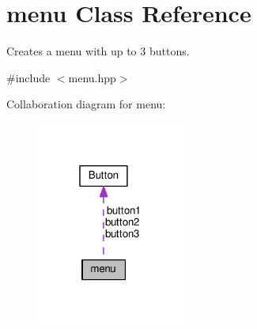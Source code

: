 \hypertarget{classmenu}{}\section{menu Class Reference}
\label{classmenu}


Creates a menu with up to 3 buttons.  




{\ttfamily \#include $<$menu.\+hpp$>$}



Collaboration diagram for menu\+:\nopagebreak
\begin{figure}[H]
\begin{center}
\leavevmode
\includegraphics[width=139pt]{classmenu__coll__graph}
\end{center}
\end{figure}
